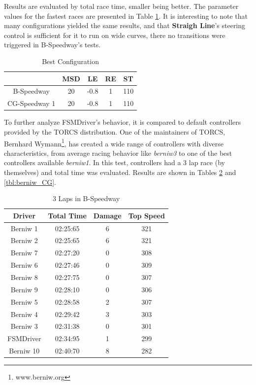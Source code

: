 Results are evaluated by total race time, smaller being better. The parameter values 
for the fastest races are presented in Table \ref{tbl:best_config}.
It is interesting to note that many configurations yielded the same results, and 
that \textbf{Straigh Line}'s steering control is sufficient for it to run on wide
curves, there no transitions were triggered in B-Speedway's tests.

\begin{table}[h]
\caption{Best Configuration}
\label{tbl:best_config}
\centering
\begin{tabular}{c||c||c||c||c}
\hline & MSD & LE & RE & ST \\ \hline\hline
B-Speedway & 20 & -0.8 & 1 & 110 \\\hline
CG-Speedway 1 & 20 & -0.8 & 1 & 110 \\\hline
\end{tabular} 
\end{table}

To further analyze FSMDriver's behavior, it is  
compared to default controllers provided by the TORCS distribution. One of the 
maintainers of TORCS, Bernhard Wymann\footnote{www.berniw.org}, has created
a wide range of controllers with diverse characteristics, from average racing 
behavior like \emph{berniw3} to one of the best controllers available \emph{berniw1}.
In this test, controllers had a 3 lap race (by themselves) and total time was 
evaluated. Results are shown in Tables \ref{tbl:berniw_B} and \ref{tbl:berniw_CG}.

\begin{table}[h]
\renewcommand{\arraystretch}{1.3}
\caption{3 Laps in B-Speedway}
\label{tbl:berniw_B}
\centering
\begin{tabular}{c||c||c||c}
\hline
\bfseries Driver & \bfseries Total Time & \bfseries Damage & \bfseries Top Speed \\ 
\hline
\hline Berniw 1 & 02:25:65 & 6 & 321 \\
\hline Berniw 2 & 02:25:65 & 6 & 321 \\
\hline Berniw 7 & 02:27:20 & 0 & 308 \\
\hline Berniw 6 & 02:27:46 & 0 & 309 \\
\hline Berniw 8 & 02:27:75 & 0 & 307 \\
\hline Berniw 9 & 02:28:10 & 0 & 306 \\
\hline Berniw 5 & 02:28:58 & 2 & 307 \\
\hline Berniw 4 & 02:29:42 & 3 & 303 \\
\hline Berniw 3 & 02:31:38 & 0 & 301 \\
\hline FSMDriver & 02:34:95 & 1 & 299 \\ 
\hline Berniw 10 & 02:40:70 & 8 & 282 \\ 
\hline 
\end{tabular}
\end{table}

